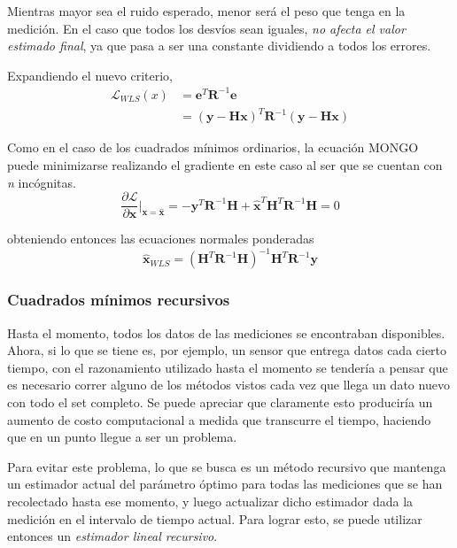 Mientras mayor sea el ruido esperado, menor será el peso que tenga en la medición. En el caso que todos los desvíos sean iguales, \textit{no afecta el valor estimado final}, ya que pasa a ser una constante dividiendo a todos los errores.

Expandiendo el nuevo criterio,
\begin{align}
    \mathscr{L}_{WLS}(x) &= \textbf{e}^T\textbf{R}^{-1}\textbf{e} \\
                         &= (\textbf{y} - \textbf{H}\textbf{x})^T\textbf{R}^{-1}(\textbf{y}-\textbf{H}\textbf{x})
\end{align}

Como en el caso de los cuadrados mínimos ordinarios, la ecuación MONGO puede minimizarse realizando el gradiente en este caso al ser que se cuentan con \textit{n} incógnitas.
\begin{equation}
    \frac{\partial \mathscr{L}}{\partial \textbf{x}}\bigg\rvert_{\textbf{x}=\hat{\textbf{x}}} = -\textbf{y}^T\textbf{R}^{-1}\textbf{H} + \hat{\textbf{x}}^T\textbf{H}^T\textbf{R}^{-1}\textbf{H} = 0
\end{equation}

obteniendo entonces las ecuaciones normales ponderadas
\begin{equation}
    \hat{\textbf{x}}_{WLS} = (\textbf{H}^T\textbf{R}^{-1}\textbf{H})^{-1} \textbf{H}^T\textbf{R}^{-1}\textbf{y}
\end{equation}

\subsubsection{Cuadrados mínimos recursivos}

Hasta el momento, todos los datos de las mediciones se encontraban disponibles. Ahora, si lo que se tiene es, por ejemplo, un sensor que entrega datos cada cierto tiempo, con el razonamiento utilizado hasta el momento se tendería a pensar que es necesario correr alguno de los métodos vistos cada vez que llega un dato nuevo con todo el set completo. Se puede apreciar que claramente esto produciría un aumento de costo computacional a medida que transcurre el tiempo, haciendo que en un punto llegue a ser un problema.

Para evitar este problema, lo que se busca es un método recursivo que mantenga un estimador actual del parámetro óptimo para todas las mediciones que se han recolectado hasta ese momento, y luego actualizar dicho estimador dada la medición en el intervalo de tiempo actual. Para lograr esto, se puede utilizar entonces un \textit{estimador lineal recursivo}.

